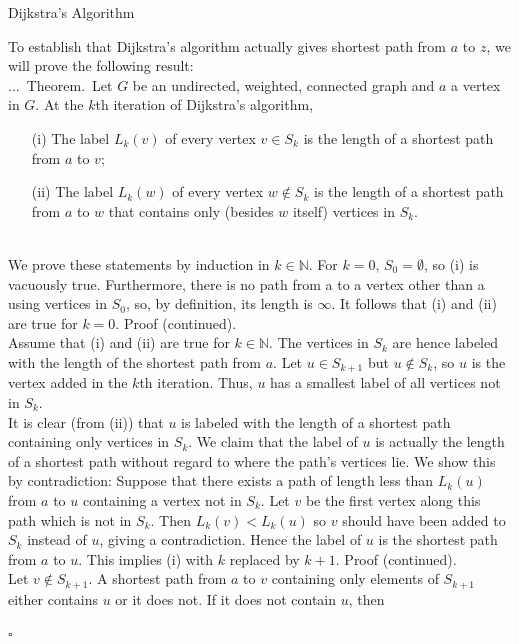 \documentclass[smaller,hyperref={CJKbookmarks=true}]{beamer}
\newcommand{\N}{\mathbb{N}} \newcommand{\Z}{\mathbb{Z}} \newcommand{\Q}{\mathbb{Q}}
\newenvironment{PROOF}{{\noindent\!\sf\alert{Proof.}}\\}{\hfill$\square$\\}
\newcounter{zhuo}[subsection]
\renewcommand{\thezhuo}{\thesection.\thesubsection.\arabic{zhuo}}
\newenvironment{THEOREM}{\stepcounter{zhuo}\alert{\thezhuo.~Theorem.\,}}{}
\begin{document}
\begin{frame}{Dijkstra's Algorithm}
\begin{spacing}{1.15}
To establish that Dijkstra's algorithm actually gives shortest path from $a$
to $z$, we will prove the following result:\\[5pt]
\begin{THEOREM}
Let $G$ be an undirected, weighted, connected graph and $a$ a vertex in $G$. At the $k$th iteration of Dijkstra's algorithm,
\begin{itemize}
  \item[(i)] The label $L_k(v)$ of every vertex $v\in S_k$ is the length of a shortest path from $a$ to $v$;
  \item[(ii)] The label $L_k(w)$ of every vertex $w\notin S_k$ is the length of a shortest path from $a$ to $w$ that contains only (besides $w$ itself) vertices in $S_k$.
\end{itemize}
\begin{PROOF}
We prove these statements by induction in $k\in\N$. For $k=0,\,S_0=\emptyset$, so (i) is vacuously true. Furthermore, there is no path from a to a vertex
other than a using vertices in $S_0$, so, by definition, its length is $\infty$. It follows that (i) and (ii) are true for $k=0$.
\newpage
\alert{Proof (continued).}\\
Assume that (i) and (ii) are true for $k\in\N$. The vertices in $S_k$ are hence labeled with the length of the shortest path from $a$. Let $u \in S_{k+1}$ but
$u\notin
S_k$, so $u$ is the vertex added in the $k$th iteration. Thus, $u$ has a
smallest label of all vertices not in $S_k$.\\[6pt]
It is clear (from (ii)) that $u$ is labeled with the length of a shortest path
containing only vertices in $S_k$. We claim that the label of $u$ is actually the length of a shortest path without regard to where the path's vertices lie. We show this by contradiction: Suppose that there exists a path of length less than $L_k (u)$ from $a$ to $u$ containing a vertex not in $S_k$. Let $v$ be the first vertex along this path which is not in $S_k$. Then $L_k(v) < L_k (u)$ so $v$
should have been added to $S_k$ instead of $u$, giving a contradiction. Hence
the label of $u$ is the shortest path from $a$ to $u$. This implies (i) with $k$
replaced by $k + 1$.
\newpage
\alert{Proof (continued).}\\
Let $v\notin S_{k+1}$. A shortest path from $a$ to $v$ containing only elements of
$S_{k+1}$ either contains $u$ or it does not. If it does not contain $u$, then

\end{PROOF}
\end{THEOREM}
\end{spacing}
\end{frame}
\end{document}
